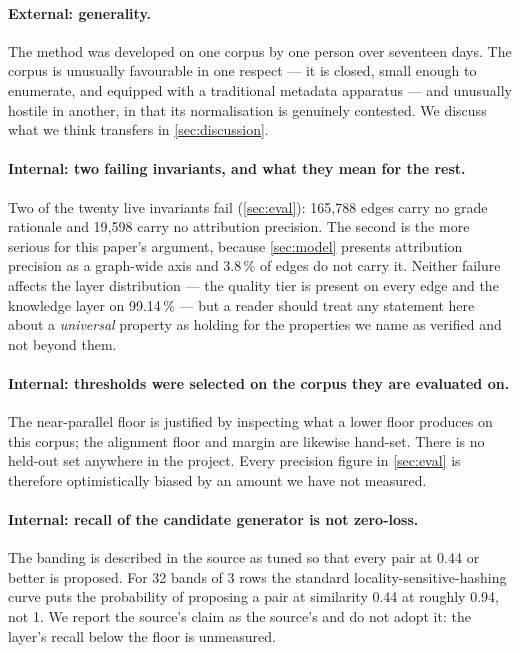 \paragraph{External: generality.} The method was developed on one corpus by one
person over seventeen days. The corpus is unusually favourable in one respect --- it
is closed, small enough to enumerate, and equipped with a traditional metadata
apparatus --- and unusually hostile in another, in that its normalisation is
genuinely contested. We discuss what we think transfers in \cref{sec:discussion}.

\paragraph{Internal: two failing invariants, and what they mean for the rest.} Two
of the twenty live invariants fail (\cref{sec:eval}): 165{,}788 edges carry no grade
rationale and 19{,}598 carry no attribution precision. The second is the more
serious for this paper's argument, because \cref{sec:model} presents attribution
precision as a graph-wide axis and 3.8\,\% of edges do not carry it. Neither
failure affects the layer distribution --- the quality tier is present on every
edge and the knowledge layer on 99.14\,\% --- but a reader should treat any
statement here about a \emph{universal} property as holding for the properties we
name as verified and not beyond them.

\paragraph{Internal: thresholds were selected on the corpus they are evaluated on.}
The near-parallel floor is justified by inspecting what a lower floor produces on
this corpus; the alignment floor and margin are likewise hand-set. There is no
held-out set anywhere in the project. Every precision figure in \cref{sec:eval} is
therefore optimistically biased by an amount we have not measured.

\paragraph{Internal: recall of the candidate generator is not zero-loss.} The
banding is described in the source as tuned so that every pair at 0.44 or better is
proposed. For 32 bands of 3 rows the standard locality-sensitive-hashing curve puts
the probability of proposing a pair at similarity 0.44 at roughly 0.94, not 1. We
report the source's claim as the source's and do not adopt it: the layer's recall
below the floor is unmeasured.

